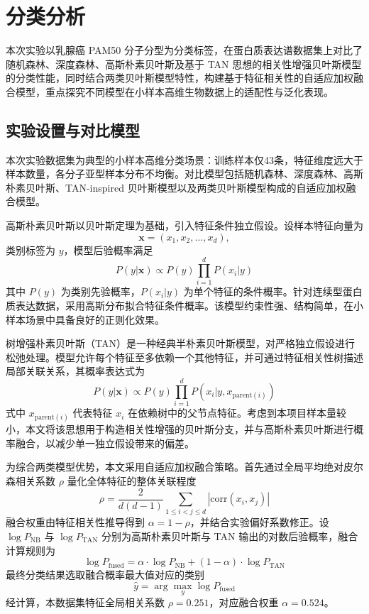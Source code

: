 \section{分类分析}
\label{sec:classification}

本次实验以乳腺癌 PAM50 分子分型为分类标签，在蛋白质表达谱数据集上对比了随机森林、深度森林、高斯朴素贝叶斯及基于 TAN 思想的相关性增强贝叶斯模型的分类性能，同时结合两类贝叶斯模型特性，构建基于特征相关性的自适应加权融合模型，重点探究不同模型在小样本高维生物数据上的适配性与泛化表现。

\subsection{实验设置与对比模型}
本次实验数据集为典型的小样本高维分类场景：训练样本仅43条，特征维度远大于样本数量，各分子亚型样本分布不均衡。对比模型包括随机森林、深度森林、高斯朴素贝叶斯、TAN-inspired 贝叶斯模型以及两类贝叶斯模型构成的自适应加权融合模型。

高斯朴素贝叶斯以贝叶斯定理为基础，引入特征条件独立假设。设样本特征向量为
\[
\boldsymbol{x}=(x_1,x_2,\dots,x_d),
\]
类别标签为 \(y\)，模型后验概率满足
\[
P(y|\boldsymbol{x}) \propto P(y)\prod_{i=1}^{d} P(x_i|y)
\]
其中 $P(y)$ 为类别先验概率，$P(x_i|y)$ 为单个特征的条件概率。针对连续型蛋白质表达数据，采用高斯分布拟合特征条件概率。该模型约束性强、结构简单，在小样本场景中具备良好的正则化效果。

树增强朴素贝叶斯（TAN）是一种经典半朴素贝叶斯模型，对严格独立假设进行松弛处理。模型允许每个特征至多依赖一个其他特征，并可通过特征相关性树描述局部关联关系，其概率表达式为
\[
P(y|\boldsymbol{x}) \propto P(y)\prod_{i=1}^{d} P(x_i|y,x_{\text{parent}(i)})
\]
式中 $x_{\text{parent}(i)}$ 代表特征 $x_i$ 在依赖树中的父节点特征。考虑到本项目样本量较小，本文将该思想用于构造相关性增强的贝叶斯分支，并与高斯朴素贝叶斯进行概率融合，以减少单一独立假设带来的偏差。

为综合两类模型优势，本文采用自适应加权融合策略。首先通过全局平均绝对皮尔森相关系数 $\rho$ 量化全体特征的整体关联程度
\[
\rho = \frac{2}{d(d-1)}\sum_{1\le i<j\le d} \left|\text{corr}(x_i,x_j)\right|
\]
融合权重由特征相关性推导得到 $\alpha = 1-\rho$，并结合实验偏好系数修正。设 $\log P_{\text{NB}}$ 与 $\log P_{\text{TAN}}$ 分别为高斯朴素贝叶斯与 TAN 输出的对数后验概率，融合计算规则为
\[
\log P_{\text{fused}} = \alpha \cdot \log P_{\text{NB}} + (1-\alpha) \cdot \log P_{\text{TAN}}
\]
最终分类结果选取融合概率最大值对应的类别
\[
\hat{y} = \arg\max_y \log P_{\text{fused}}
\]
经计算，本数据集特征全局相关系数 $\rho=0.251$，对应融合权重 $\alpha=0.524$。

